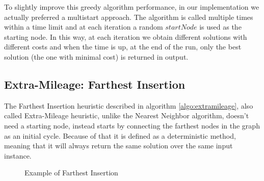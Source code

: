 To slightly improve this greedy algorithm performance, in our implementation we actually preferred a multistart approach. The algorithm is called multiple times within a time limit and at each iteration a random $startNode$ is used as the starting node. In this way, at each iteration we obtain different solutions with different costs and when the time is up, at the end of the run, only the best solution (the one with minimal cost) is returned in output.



\subsection{Extra-Mileage: Farthest Insertion}\label{extramileage}
The Farthest Insertion heuristic described in algorithm \ref{algo:extramileage}, also called Extra-Mileage heuristic, unlike the Nearest Neighbor algorithm, doesn’t need a starting node, instead starts by connecting the farthest nodes in the graph as an initial cycle. Because of that it is defined as a deterministic method, meaning that it will always return the same solution over the same input instance.

\begin{figure}[!h]
    \centering
    \caption{Example of Farthest Insertion} \label{fig:extra}
\end{figure}

